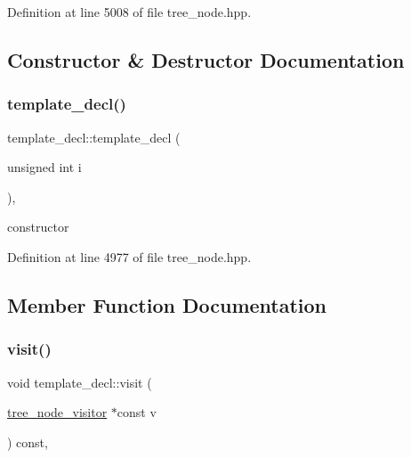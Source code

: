 Definition at line 5008 of file tree\+\_\+node.\+hpp.



\subsection{Constructor \& Destructor Documentation}
\mbox{\label{structtemplate__decl_affa717d13d5eb3d7105f9e41fd5104d9}} 
\subsubsection{\texorpdfstring{template\+\_\+decl()}{template\_decl()}}
{\footnotesize\ttfamily template\+\_\+decl\+::template\+\_\+decl (\begin{DoxyParamCaption}\item[{unsigned int}]{i }\end{DoxyParamCaption})\hspace{0.3cm}{\ttfamily [inline]}, {\ttfamily [explicit]}}



constructor 



Definition at line 4977 of file tree\+\_\+node.\+hpp.



\subsection{Member Function Documentation}
\mbox{\label{structtemplate__decl_a38f7c267485cd3aaefda2f7f49132af1}} 
\subsubsection{\texorpdfstring{visit()}{visit()}}
{\footnotesize\ttfamily void template\+\_\+decl\+::visit (\begin{DoxyParamCaption}\item[{\hyperlink{classtree__node__visitor}{tree\+\_\+node\+\_\+visitor} $\ast$const}]{v }\end{DoxyParamCaption}) const\hspace{0.3cm}{\ttfamily [override]}, {\ttfamily [virtual]}}



